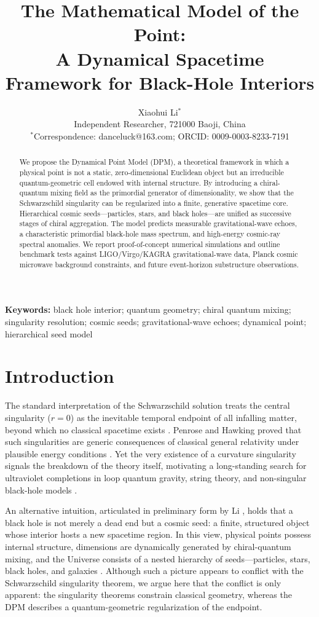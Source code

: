 \documentclass[11pt,a4paper]{article}
\title{\bfseries The Mathematical Model of the Point:\\
A Dynamical Spacetime Framework for Black-Hole Interiors}
\author{Xiaohui Li$^{*}$\\
\normalsize Independent Researcher, 721000 Baoji, China\\
\normalsize $^{*}$Correspondence: danceluck@163.com; ORCID: 0009-0003-8233-7191}
\date{}
\begin{document}
\maketitle

\begin{abstract}
\noindent
We propose the Dynamical Point Model (DPM), a theoretical framework in which a physical point is not a static, zero-dimensional Euclidean object but an irreducible quantum-geometric cell endowed with internal structure. By introducing a chiral-quantum mixing field as the primordial generator of dimensionality, we show that the Schwarzschild singularity can be regularized into a finite, generative spacetime core. Hierarchical cosmic seeds---particles, stars, and black holes---are unified as successive stages of chiral aggregation. The model predicts measurable gravitational-wave echoes, a characteristic primordial black-hole mass spectrum, and high-energy cosmic-ray spectral anomalies. We report proof-of-concept numerical simulations and outline benchmark tests against LIGO/Virgo/KAGRA gravitational-wave data, Planck cosmic microwave background constraints, and future event-horizon substructure observations.
\end{abstract}

\noindent\textbf{Keywords:} black hole interior; quantum geometry; chiral quantum mixing; singularity resolution; cosmic seeds; gravitational-wave echoes; dynamical point; hierarchical seed model

\section{Introduction}

The standard interpretation of the Schwarzschild solution treats the central singularity ($r = 0$) as the inevitable temporal endpoint of all infalling matter, beyond which no classical spacetime exists \cite{schwarzschild1916,oppenheimer1939}. Penrose and Hawking proved that such singularities are generic consequences of classical general relativity under plausible energy conditions \cite{penrose1965,hawking1966}. Yet the very existence of a curvature singularity signals the breakdown of the theory itself, motivating a long-standing search for ultraviolet completions in loop quantum gravity, string theory, and non-singular black-hole models \cite{bardeen1968,hayward2006,ashtekar2006,rovelli2014,maldacena1998}.

An alternative intuition, articulated in preliminary form by Li \cite{li2024}, holds that a black hole is not merely a dead end but a cosmic seed: a finite, structured object whose interior hosts a new spacetime region. In this view, physical points possess internal structure, dimensions are dynamically generated by chiral-quantum mixing, and the Universe consists of a nested hierarchy of seeds---particles, stars, black holes, and galaxies \cite{li2024}. Although such a picture appears to conflict with the Schwarzschild singularity theorem, we argue here that the conflict is only apparent: the singularity theorems constrain classical geometry, whereas the DPM describes a quantum-geometric regularization of the endpoint.
\end{document}

